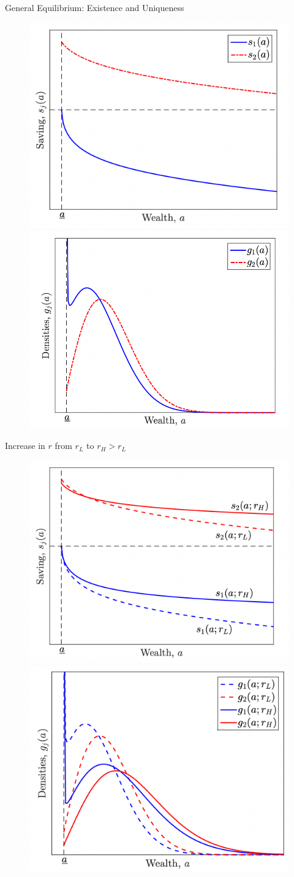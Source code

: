 \documentclass[11pt, aspectratio=169]{beamer}
\begin{document}
\begin{frame}{General Equilibrium: Existence and Uniqueness}
	\begin{figure}[tph]
		\centering
		\includegraphics[width=.45\textwidth]{./figures/HACT_savings} \qquad \includegraphics[width=.45\textwidth]{./figures/HACT_distribution}
	\end{figure}
\end{frame}


\begin{frame}{Increase in $r$ from $r_L$ to $r_H>r_L$}
	\begin{figure}[ht]
		\centering
		\includegraphics[width=.45\textwidth]{./figures/HACT_savings2} \qquad \includegraphics[width=.45\textwidth]{./figures/HACT_distribution2}
	\end{figure}
\end{frame}
\end{document}
